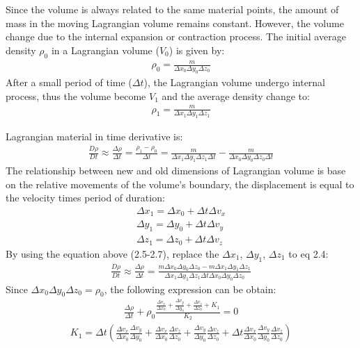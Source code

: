 Since the volume is always related to the same material points, the amount of mass in the moving Lagrangian volume remains constant. However, the volume change due to the internal expansion or contraction process. The initial average density $\rho_0$ in a Lagrangian volume ($V_0$) is given by:
\begin{align}
\rho_0 = \frac{m}{\Delta x_0 \Delta y_0 \Delta z_0}
\end{align}
After a small period of time ($\Delta t$), the Lagrangian volume undergo internal process, thus the volume become $V_1$ and the average density change to:
\begin{align}
\rho_1 = \frac{m}{\Delta x_1 \Delta y_1 \Delta z_1}
\end{align}

Lagrangian material in time derivative is:
\begin{align}
\frac{D\rho}{Dt} \approx \frac{\Delta \rho}{\Delta t} = \frac{\rho_1-\rho_0}{\Delta t}=\frac{m}{\Delta x_1 \Delta y_1 \Delta z_1\Delta t}-\frac{m}{\Delta x_0 \Delta y_0 \Delta z_0\Delta t}
\end{align}
The relationship between new and old dimensions of Lagrangian volume is base on the relative movements of the volume's boundary, the displacement is equal to the velocity times period of duration:
\begin{align}
\Delta x_1 = \Delta x_0+\Delta t\Delta v_x\\
\Delta y_1 = \Delta y_0+\Delta t\Delta v_y\\
\Delta z_1 = \Delta z_0+\Delta t\Delta v_z
\end{align}
By using the equation above (2.5-2.7), replace the $\Delta x_1$, $\Delta y_1$, $\Delta z_1$ to eq 2.4:
\begin{align}
\frac{D\rho}{Dt} \approx \frac{\Delta \rho}{\Delta t} =\frac{m\Delta x_0 \Delta y_0 \Delta z_0-m\Delta x_1 \Delta y_1 \Delta z_1}{\Delta x_1 \Delta y_1 \Delta z_1\Delta t\Delta x_0 \Delta y_0 \Delta z_0}
\end{align}
Since $\Delta x_0 \Delta y_0 \Delta z_0=\rho_0$, the following expression can be obtain:
\begin{align}
\frac{\Delta \rho}{\Delta t}+\rho_0\frac{\frac{\Delta v_x}{\Delta x_0}+\frac{\Delta v_y}{\Delta y_0}+\frac{\Delta v_z}{\Delta z_0}+K_1}{K_2} = 0
\end{align}
\begin{align}
K_1 = \Delta t(\frac{\Delta v_x}{\Delta x_0}\frac{\Delta v_y}{\Delta y_0}+\frac{\Delta v_x}{\Delta x_0}\frac{\Delta v_z}{\Delta z_0}+\frac{\Delta v_y}{\Delta y_0}\frac{\Delta v_z}{\Delta z_0}+\Delta t \frac{\Delta v_x}{\Delta x_0}\frac{\Delta v_y}{\Delta y_0}\frac{\Delta v_z}{\Delta z_0})
\end{align}
